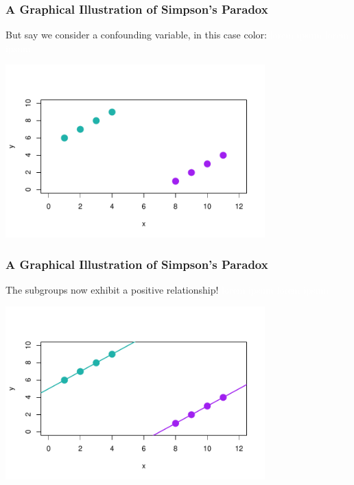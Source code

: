 \documentclass[slides]{beamer}\usepackage[]{graphicx}\usepackage[]{color}
\newcommand{\blue}[1]{\textcolor{blue2}{#1}}
\begin{document}
\begin{frame}
\frametitle{A Graphical Illustration of Simpson's Paradox}
But say we consider a \blue{confounding} variable, in this case \blue{color}: \textcolor{white}{lorem ipsum lorem ipsum}
\begin{center}
\includegraphics[width=10cm]{simpsons3.pdf}
\end{center}

\end{frame}



\begin{frame}
\frametitle{A Graphical Illustration of Simpson's Paradox}
The subgroups now exhibit a \blue{positive} relationship! \textcolor{white}{lorem ipsum lorem ipsum}
\begin{center}
\includegraphics[width=10cm]{simpsons4.pdf}
\end{center}

\end{frame}
\end{document}
